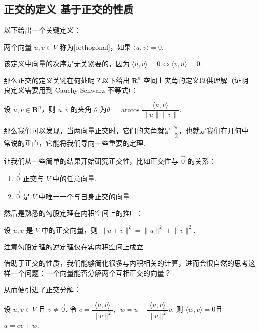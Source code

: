 \subsection{正交的定义 \quad 基于正交的性质}

以下给出一个关键定义：

\begin{definition}
    两个向量 $u, v \in V$ 称为[orthogonal]，如果 $\langle u, v\rangle = 0$.
\end{definition}

该定义中向量的次序是无关紧要的，因为 $\langle u, v\rangle = 0 \iff \langle v, u\rangle = 0$.

那么正交的定义关键在何处呢？以下给出 $\mathbf{R}^{n}$ 空间上夹角的定义以供理解（证明良定义需要用到 Cauchy-Schwarz 不等式）：

\begin{definition}
    设 $u, v \in \mathbf{R}^{n}$，则 $u, v$ 的夹角 $ \theta $ 为$ \theta = \arccos \dfrac{\langle u, v\rangle}{\lVert u \rVert \lVert v \rVert}$.
\end{definition}

那么我们可以发现，当两向量正交时，它们的夹角就是 $\dfrac{\pi}{2}$，也就是我们在几何中常说的垂直，它能将我们导向一些重要的定理.

让我们从一些简单的结果开始研究正交性，比如正交性与 $ \vec{0} $ 的关系：

\begin{enumerate}
    \item $ \vec{0} $ 正交与 $V$ 中的任意向量.

    \item $ \vec{0} $ 是 $V$ 中唯一一个与自身正交的向量.
\end{enumerate}

然后是熟悉的勾股定理在内积空间上的推广：

\begin{theorem}
    设 $u, v$ 是 $V$ 中的正交向量，则 $\lVert u + v \rVert^2 = \lVert u \rVert^2 + \lVert v \rVert^2 $.
\end{theorem}

注意勾股定理的逆定理仅在实内积空间上成立.

借助于正交的性质，我们能够简化很多与内积相关的计算，进而会很自然的思考这样一个问题：一个向量能否分解两个互相正交的向量？

从而便引进了正交分解：

\begin{theorem}
    设 $u, v \in V$ 且 $v \neq \vec{0}$. 令 $ c = \dfrac{\langle u, v\rangle}{\lVert v \rVert^2}, \enspace w = u - \dfrac{\langle u, v\rangle}{\lVert v \rVert^2}v$. 则 $\langle w, v\rangle = 0$且 $u = cv + w$.
\end{theorem}

